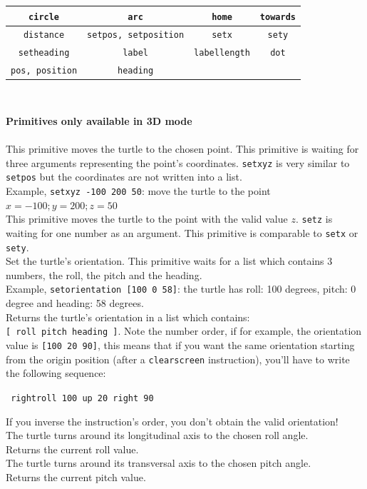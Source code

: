 \begin{center}
\begin{tabular}{|cccc|}
\hline
\texttt{circle}&
\texttt{arc}&
\texttt{home}&
\texttt{towards}\\
\hline
\texttt{distance}&
\texttt{setpos, setposition}&
\texttt{setx}&
\texttt{sety}\\
\hline
\texttt{setheading}&
\texttt{label}&
\texttt{labellength}&
\texttt{dot}\\
\hline
\texttt{pos, position}&
\texttt{heading} & &\\
\hline
\end{tabular} \\ \vspace{0.5cm}
\end{center}
\textbf{Primitives only available in 3D mode}\\ \\
This primitive moves the turtle to the chosen point. This primitive is waiting for three arguments representing the point's coordinates. \texttt{setxyz} is very similar to \texttt{setpos} but the coordinates are not written into a list. \\
Example, \texttt{setxyz -100 200 50}: move the turtle to the point $x=-100;y=200;z=50$\\
This primitive moves the turtle to the point with the valid value $z$. \texttt{setz} is waiting for one number as an argument. This primitive is comparable to \texttt{setx} or \texttt{sety}. \\
Set the turtle's orientation. This primitive waits for a list which contains 3 numbers, the roll, the pitch and the heading.\\
Example, \texttt{setorientation [100 0 58]}: the turtle has roll: 100 degrees, pitch: 0 degree and heading: 58 degrees.\\
Returns the turtle's orientation in a list which contains: \texttt{[~roll~pitch~heading~]}. Note the number order, if for example, the orientation value is \texttt{[100 20 90]}, this means that if you want the same orientation starting from the origin position (after a \texttt{clearscreen} instruction), you'll have to write the following sequence:
\begin{center}
\texttt{ rightroll 100 up 20 right 90}
\end{center}
If you inverse the instruction's order, you don't obtain the valid orientation!\\
The turtle turns around its longitudinal axis to the chosen roll angle.\\
 Returns the current roll value.\\
The turtle turns around its transversal axis to the chosen pitch angle.\\
Returns the current pitch value.
